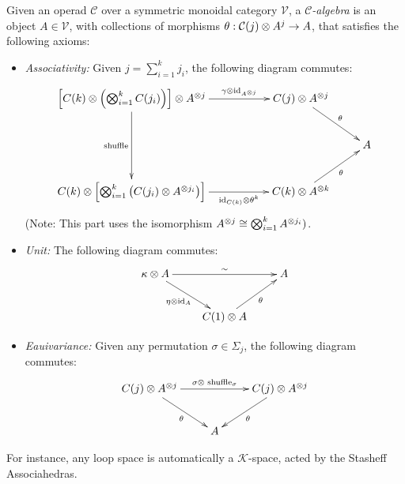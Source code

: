 \documentclass{article}
\begin{document}
\begin{defn}
    Given an operad $\mathcal{C}$ over a symmetric monoidal category $\mathcal{V}$, a \emph{$\mathcal{C}$-algebra} is an object $A\in\mathcal{V}$, with collections of morphisms $\theta:\mathcal{C}(j)\otimes A^j\rightarrow A$, that satisfies the following axioms:
    \begin{itemize}
        \item \emph{Associativity:} Given $j = \sum_{i=1}^k j_i$, the following diagram commutes:
        \[\xymatrix{
            \left[C(k)\tensor \left(\bigtensor_{i=1}^k C(j_i)\right)\right] \tensor A^{\tensor j} \ar[dd]_-{\text{shuffle}} \ar[rr]^-{\gamma\tensor \id_{A^{\tensor j}}} && C(j)\tensor A^{\tensor j} \ar[dr]^-{\theta}\\
            & & & A\\
            C(k)\tensor \left[\bigtensor_{i=1}^k \left(C(j_i)\tensor A^{\tensor j_i}\right)\right] \ar[rr]_-{\id_{C(k)}\tensor \theta^k} && C(k)\tensor A^{\tensor k} \ar[ur]_-{\theta}
        }\]
        (Note: This part uses the isomorphism $A^{\otimes j}\cong\bigotimes_{i=1}^k A^{\otimes j_i})$.
        \item \emph{Unit:} The following diagram commutes:
        \[\xymatrix{
            \kappa \tensor A \ar[dr]_-{\eta\tensor \id_A} \ar[rr]^-{\sim} && A\\
            & C(1)\tensor A \ar[ur]_-{\theta}
        }\]
        \item \emph{Eauivariance:} Given any permutation $\sigma\in\Sigma_j$, the following diagram commutes:
        \[\xymatrix{
            C(j)\tensor A^{\tensor j} \ar[dr]_-{\theta} \ar[rr]^-{\sigma\tensor \text{ shuffle}_{\sigma}} && C(j)\tensor A^{\tensor j} \ar[dl]^-{\theta}\\
            & A
        }\]
    \end{itemize}
\end{defn}

\hfil

For instance, any loop space is automatically a $\mathcal{K}$-space, acted by the Stasheff Associahedras.
\end{document}
